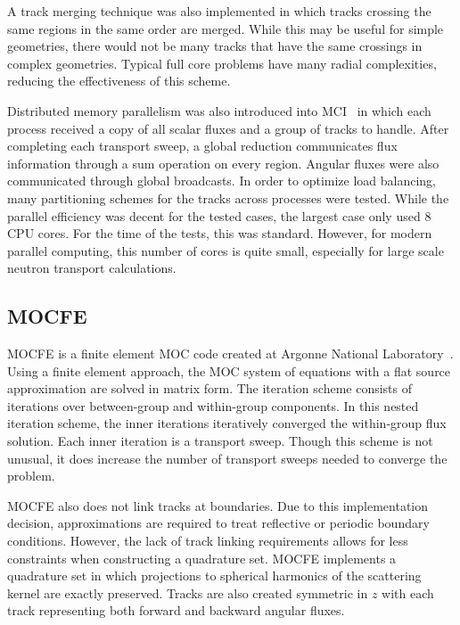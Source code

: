 A track merging technique was also implemented in which tracks crossing the same regions in the same order are merged. While this may be useful for simple geometries, there would not be many tracks that have the same crossings in complex geometries. Typical full core problems have many radial complexities, reducing the effectiveness of this scheme.

Distributed memory parallelism was also introduced into MCI~\cite{dragon_parallel} in which each process received a copy of all scalar fluxes and a group of tracks to handle. After completing each transport sweep, a global reduction communicates flux information through a sum operation on every region. Angular fluxes were also communicated through global broadcasts. In order to optimize load balancing, many partitioning schemes for the tracks across processes were tested. While the parallel efficiency was decent for the tested cases, the largest case only used 8 CPU cores. For the time of the tests, this was standard. However, for modern parallel computing, this number of cores is quite small, especially for large scale neutron transport calculations.

\subsection{MOCFE}
\label{sec:mocfe}

MOCFE is a finite element \ac{MOC} code created at Argonne National Laboratory~\cite{mocfe_init}. Using a finite element approach, the \ac{MOC} system of equations with a flat source approximation are solved in matrix form. The iteration scheme consists of iterations over between-group and within-group components. In this nested iteration scheme, the inner iterations iteratively converged the within-group flux solution. Each inner iteration is a transport sweep. Though this scheme is not unusual, it does increase the number of transport sweeps needed to converge the problem.

MOCFE also does not link tracks at boundaries. Due to this implementation decision, approximations are required to treat reflective or periodic boundary conditions. However, the lack of track linking requirements allows for less constraints when constructing a quadrature set. MOCFE implements a quadrature set in which projections to spherical harmonics of the scattering kernel are exactly preserved. Tracks are also created symmetric in $z$ with each track representing both forward and backward angular fluxes.

